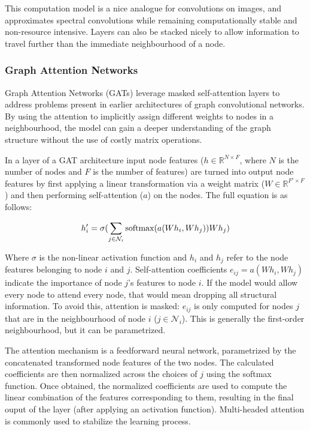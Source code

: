 	This computation model is a nice analogue for convolutions on images, and approximates spectral convolutions while remaining computationally stable and non-resource intensive. Layers can also be stacked nicely to allow information to travel further than the immediate neighbourhood of a node.
	
	\subsubsection{Graph Attention Networks}
	
	Graph Attention Networks (GATs) leverage masked self-attention layers to address problems present in earlier architectures of graph convolutional networks\cite{gat_paper}. By using the attention to implicitly assign different weights to nodes in a neighbourhood, the model can gain a deeper understanding of the graph structure without the use of costly matrix operations.
	
	In a layer of a GAT architecture input node features ($h \in \mathbb{R}^{N\times F}$, where $N$ is the number of nodes and $F$ is the number of features) are turned into output node features by first applying a linear transformation via a weight matrix ($W \in \mathbb{R}^{F'\times F} $) and then performing self-attention ($a$) on the nodes. The full equation is as follows:
	
	$$ h'_i = \sigma (\sum_{j \in \mathcal{N}_i} \textnormal{softmax}(a(Wh_i, Wh_j))Wh_j ) $$
	
	Where $\sigma$ is the non-linear activation function and $h_i$ and $h_j$ refer to the node features belonging to node $i$ and $j$. Self-attention coefficients $ e_{ij} = a(W h_i, W h_j) $ indicate the importance of node $j$'s features to node $i$. If the model would allow every node to attend every node, that would mean dropping all structural information. To avoid this, attention is masked: $e_{ij}$ is only computed for nodes $j$ that are in the neighbourhood of node $i$ ($j \in \mathcal{N}_i$). This is generally the first-order neighbourhood, but it can be parametrized.
	
	The attention mechanism is a feedforward neural network, parametrized by the concatenated transformed node features of the two nodes. The calculated coefficients are then normalized across the choices of $j$ using the softmax function. Once obtained, the normalized coefficients are used to compute the linear combination of the features corresponding to them, resulting in the final ouput of the layer (after applying an activation function). Multi-headed attention is commonly used to stabilize the learning process.
	
